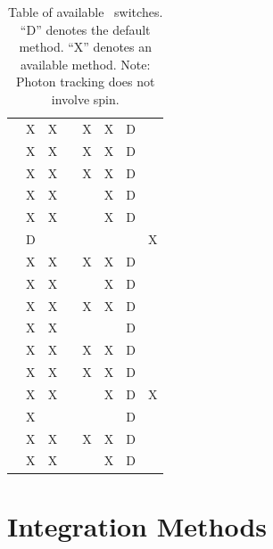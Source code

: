 \begin{table}[pth]
{\begin{tabular}{lcccccc}
                         & X & X &   & X & X & D &   \\  
    & X & X &   & X & X & D &   \\  
                          & X & X &   & X & X & D &   \\  
            & X & X &   &   & X & D &   \\  
                          & X & X &   &   & X & D &   \\  
                           & D &   &   &   &   &   & X \\  
                        & X & X &   & X & X & D &   \\ 
                           & X & X &   &   & X & D &   \\ 
                      & X & X &   & X & X & D &   \\ 
                        & X & X &   &   &   & D &   \\  
                       & X & X &   & X & X & D &   \\ 
                        & X & X &   & X & X & D &   \\ 
                        & X & X &   &   & X & D & X \\ 
                          & X &   &   &   &   & D &   \\ 
                         & X & X &   & X & X & D &   \\ 
                         & X & X &   &   & X & D &   \\ 
  \bottomrule
\end{tabular}
}

\caption[Table of available spin_tracking_method switches.]{Table of
available \ switches. ``D'' denotes the default method. 
``X'' denotes an available method. Note: Photon tracking does not involve spin.}

\label{t:spin.methods}
\end{table}

\vfill \break

\section{Integration Methods}
\label{s:integ}


